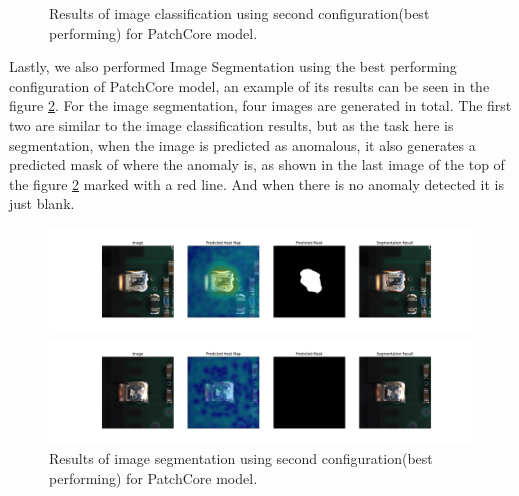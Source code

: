 \begin{figure}[ht!]
    \caption{Results of image classification using second configuration(best performing) for PatchCore model.}
    \label{fig:IC-results-patchcore}
\end{figure}

Lastly, we also performed Image Segmentation using the best performing configuration of PatchCore model, an example of its results can be seen in the figure \ref{fig:IS-results-patchcore}. For the image segmentation, four images are generated in total. The first two are similar to the image classification results, but as the task here is segmentation, when the image is predicted as anomalous, it also generates a predicted mask of where the anomaly is, as shown in the last image of the top of the figure \ref{fig:IS-results-patchcore} marked with a red line. And when there is no anomaly detected it is just blank.

\begin{figure}[ht!]
    \centering  
    \begin{minipage}{1\textwidth}
        \centering
        \includegraphics[width=1\textwidth]{Rohit_Master_Thesis//Images/IS_NG1.png} %
    \end{minipage}
    

    \begin{minipage}{1\textwidth}
        \centering
        \includegraphics[width=1\textwidth]{Rohit_Master_Thesis//Images/IS_FC.png} %
    \end{minipage}
    
    \caption{Results of image segmentation using second configuration(best performing) for PatchCore model.}
    \label{fig:IS-results-patchcore}
\end{figure}

